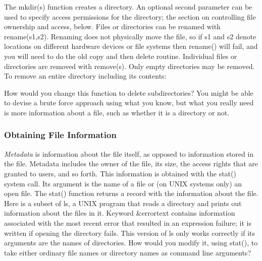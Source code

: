 The \textsf{mkdir(s)} function creates a directory. An
optional second parameter can be used to specify access permissions for
the directory; the section on controlling file ownership and access,
below. Files or directories can be renamed with \textsf{rename(s1,s2)}.
Renaming does not physically move the file, so if \textsf{s1} and
\textsf{s2} denote locations on different hardware devices or file
systems then \textsf{rename()} will fail, and you will
need to do the old {\textquotedbl}copy and then delete{\textquotedbl}
routine. Individual files or directories are removed with
\textsf{remove(s)}. Only empty directories may be
removed. To remove an entire directory including its contents:


How would you change this function to delete subdirectories? You might
be able to devise a brute force approach using what you know, but what
you really need is more information about a file, such as whether it is
a directory or not.

\subsubsection[Obtaining File Information]{Obtaining File Information}
\textit{Metadata} is information about the file
itself, as opposed to information stored in the file. Metadata includes
the owner of the file, its size, the access rights that are granted to
users, and so forth. This information is obtained with the
\textsf{stat()} system call. Its argument is the name of
a file or (on UNIX systems only) an open file. The \textsf{stat()}
function returns a record with the information about the file. Here is
a subset of \textsf{ls}, a UNIX program that reads a directory and
prints out information about the files in it. Keyword \textsf{\&errortext} contains information associated with the
most recent error that resulted in an expression
failure; it is written if opening the directory
fails. This version of \textsf{ls} only works correctly if its
arguments are the names of directories. How would you modify it, using
\textsf{stat()}, to take either ordinary file names or directory names
as command line arguments?


